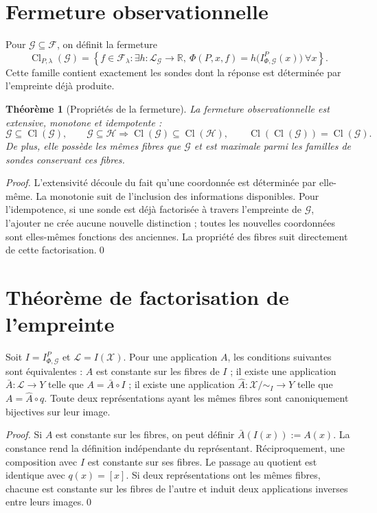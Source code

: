 \documentclass[11pt,a4paper,openany]{book}
\newtheorem{theorem}[definition]{Théorème}
\newcommand{\R}{\mathbb{R}}
\newcommand{\X}{\mathcal X}
\newcommand{\Fset}{\mathcal F}
\newcommand{\cl}{\operatorname{Cl}}
\begin{document}
\section{Fermeture observationnelle}
Pour \(\mathcal G\subseteq\Fset\), on définit la fermeture
\[
\cl_{P,\lambda}(\mathcal G)
=
\left\{f\in\Fset_\lambda:\exists h:\mathcal L_{\mathcal G}\to\R,
\ \Phi(P,x,f)=h\bigl(I_{\Phi,\mathcal G}^{P}(x)\bigr)\ \forall x\right\}.
\]
Cette famille contient exactement les sondes dont la réponse est déterminée par l'empreinte déjà produite.

\begin{theorem}[Propriétés de la fermeture]
La fermeture observationnelle est extensive, monotone et idempotente :
\[
\mathcal G\subseteq\cl(\mathcal G),\qquad
\mathcal G\subseteq\mathcal H\Rightarrow\cl(\mathcal G)\subseteq\cl(\mathcal H),
\qquad
\cl(\cl(\mathcal G))=\cl(\mathcal G).
\]
De plus, elle possède les mêmes fibres que \(\mathcal G\) et est maximale parmi les familles de sondes conservant ces fibres.
\end{theorem}
\begin{proof}
L'extensivité découle du fait qu'une coordonnée est déterminée par elle-même. La monotonie suit de l'inclusion des informations disponibles. Pour l'idempotence, si une sonde est déjà factorisée à travers l'empreinte de \(\mathcal G\), l'ajouter ne crée aucune nouvelle distinction ; toutes les nouvelles coordonnées sont elles-mêmes fonctions des anciennes. La propriété des fibres suit directement de cette factorisation.\qed
\end{proof}

\section{Théorème de factorisation de l'empreinte}
Soit \(I=I_{\Phi,\mathcal G}^{P}\) et \(\mathcal L=I(\X)\). Pour une application \(A\), les conditions suivantes sont équivalentes : \(A\) est constante sur les fibres de \(I\) ; il existe une application \(\bar A:\mathcal L\to Y\) telle que \(A=\bar A\circ I\) ; il existe une application \(\hat A:\X/{\sim_I}\to Y\) telle que \(A=\hat A\circ q\). Toute deux représentations ayant les mêmes fibres sont canoniquement bijectives sur leur image.

\begin{proof}
Si \(A\) est constante sur les fibres, on peut définir \(\bar A(I(x)):=A(x)\). La constance rend la définition indépendante du représentant. Réciproquement, une composition avec \(I\) est constante sur ses fibres. Le passage au quotient est identique avec \(q(x)=[x]\). Si deux représentations ont les mêmes fibres, chacune est constante sur les fibres de l'autre et induit deux applications inverses entre leurs images.\qed\end{proof}
\end{document}
